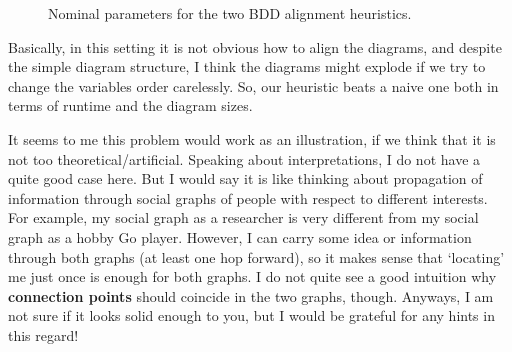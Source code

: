 \documentclass[11pt]{article}
\begin{document}
  \begin{figure}%
    \centering
    \qquad
    \caption{Nominal parameters for the two BDD alignment heuristics.}%
    \label{fig:jUFLP-abs}%
\end{figure}

Basically, in this setting it is not obvious how to align the diagrams, and
despite the simple diagram structure, I think the diagrams might explode if we
try to change the variables order carelessly. So, our heuristic beats a naive
one both in terms of runtime and the diagram sizes.

It seems to me this problem would work as an illustration, if we think that it
 is not too theoretical/artificial. Speaking about interpretations, I do not
 have a quite good case here. But I would say it is like thinking about
 propagation of information through social graphs of people with respect to
 different interests. For example, my social graph as a researcher is very
 different from my social graph as a hobby Go player. However, I can carry some
 idea or information through both graphs (at least one hop forward), so it makes
 sense that ‘locating’ me just once is enough for both graphs. I do not quite
 see a good intuition why \textbf{connection points} should coincide in the two graphs,
 though. Anyways, I am not sure if it looks solid enough to you, but I would be
 grateful for any hints in this regard!
\end{document}
